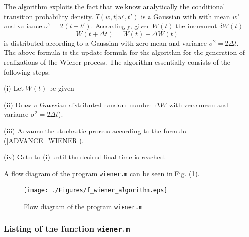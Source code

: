 The algorithm exploits the fact that we know analytically the
conditional transition probability density. $T(w,t|w',t')$ is a 
Gaussian  with with mean $w'$ and variance $\sigma^2=2(t-t')$.
Accordingly, given $W(t)$ the increment $\delta W(t)$
\begin{equation}
\label{ADVANCE_WIENER}
W(t+\Delta t) = W(t) + \Delta W(t)
\end{equation}
is distributed according to a Gaussian with zero mean and variance
$\sigma^2=2\Delta t$. The above formula is the update formula
for the algorithm for the generation of realizations of the Wiener
process. The algorithm essentially consists of the following 
steps:

(i) Let $W(t)$ be given.

(ii) Draw a Gaussian distributed random number $\Delta W$
with zero mean and variance $\sigma^2=2\Delta t$).

(iii) Advance the stochastic process according to the formula
(\ref{ADVANCE_WIENER}).

(iv) Goto to (i) until the desired final time is reached.

A flow diagram of the program \texttt{wiener.m} can be seen in 
Fig. (\ref{F_WIENER_ALGORITHM}). 
\begin{figure}
\label{F_WIENER_ALGORITHM}
\texttt{[image: ./Figures/f\_wiener\_algorithm.eps]}
\caption{Flow diagram of the program \texttt{wiener.m}}
\end{figure}
\subsubsection{Listing of the function \texttt{wiener.m}}


